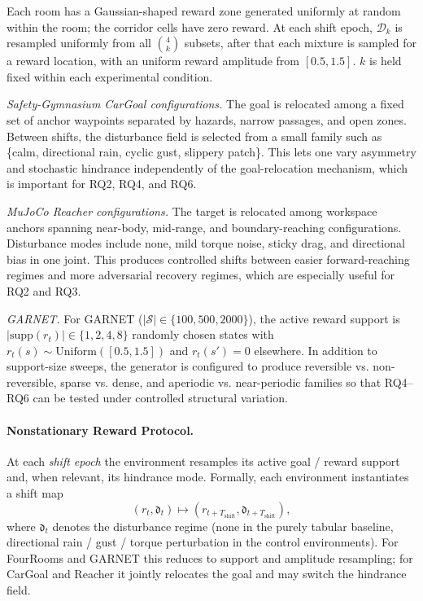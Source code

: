 \documentclass[10pt,a4paper]{article}
\begin{document}
Each room has a Gaussian-shaped reward zone generated uniformly at random within the room;
the corridor cells have zero reward.
At each shift epoch, $\mathcal{D}_k$ is resampled uniformly from all $\binom{4}{k}$ subsets, after that
each mixture is sampled for a reward location, with an uniform reward amplitude from $[0.5, 1.5]$.
$k$ is held fixed within each experimental condition.

\textit{Safety-Gymnasium CarGoal configurations.}
The goal is relocated among a fixed set of anchor waypoints separated by hazards, narrow passages, and open zones.
Between shifts, the disturbance field is selected from a small family such as \{calm, directional rain, cyclic gust, slippery patch\}.
This lets one vary asymmetry and stochastic hindrance independently of the goal-relocation mechanism, which is important for RQ2, RQ4, and RQ6.

\textit{MuJoCo Reacher configurations.}
The target is relocated among workspace anchors spanning near-body, mid-range, and boundary-reaching configurations.  
Disturbance modes include none, mild torque noise, sticky drag, and directional bias in one joint.  
This produces controlled shifts between easier forward-reaching regimes and more adversarial recovery regimes, which are especially useful for RQ2 and RQ3.

\textit{GARNET.}
For GARNET ($|\mathcal{S}| \in \{100, 500, 2000\}$), the active reward support is
$|\mathrm{supp}(r_t)| \in \{1, 2, 4, 8\}$ randomly chosen states with
$r_t(s) \sim \mathrm{Uniform}([0.5,1.5])$ and $r_t(s')=0$ elsewhere.
In addition to support-size sweeps, the generator is configured to produce reversible vs. non-reversible, sparse vs. dense, and aperiodic vs. near-periodic families so that RQ4--RQ6 can be tested under controlled structural variation.

\paragraph{Nonstationary Reward Protocol.}
At each \emph{shift epoch} the environment resamples its active goal / reward support and, when relevant, its hindrance mode.  Formally, each environment instantiates a shift map
\[
  (r_t, \mathfrak{d}_t) \mapsto (r_{t+T_{\mathrm{shift}}}, \mathfrak{d}_{t+T_{\mathrm{shift}}}),
\]
where $\mathfrak{d}_t$ denotes the disturbance regime (none in the purely tabular baseline, directional rain / gust / torque perturbation in the control environments).  For FourRooms and GARNET this reduces to support and amplitude resampling; for CarGoal and Reacher it jointly relocates the goal and may switch the hindrance field.
\end{document}
